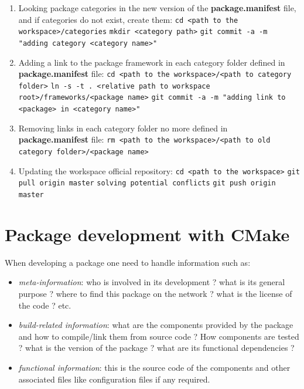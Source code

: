 \documentclass[12pt,a4paper]{article}
\begin{document}
\begin{enumerate}
\item Looking package categories in the new version of the \textbf{package.manifest} file, and if categories do not exist, create them:
\linebreak \verb|cd <path to the workspace>/categories|
\linebreak \verb|mkdir <category path>|
\linebreak \verb|git commit -a -m "adding category <category name>"|
\item Adding a link to the package framework in each category folder defined in \textbf{package.manifest} file:
\linebreak \verb|cd <path to the workspace>/<path to category folder>|
\linebreak \verb|ln -s -t . <relative path to workspace root>/frameworks/<package name>|
\linebreak \verb|git commit -a -m "adding link to <package> in <category name>"|
\item Removing links in each category folder no more defined in \textbf{package.manifest} file:
\linebreak \verb|rm <path to the workspace>/<path to old category folder>/<package name>|
\item Updating the workspace official repository:
\linebreak \verb|cd <path to the workspace>|
\linebreak \verb|git pull origin master|
\linebreak \verb|solving potential conflicts|
\linebreak \verb|git push origin master|
\end{enumerate}

\pagebreak

\section{Package development with CMake}

When developing a package one need to handle information such as:
\begin{itemize}
\item \textit{meta-information}: who is involved in its development ? what is its general purpose ? where to find this package on the network ? what is the license of the code ? etc.
\item \textit{build-related information}: what are the components provided by the package and how to compile/link them from source code ?  How components are tested ? what is the version of the package ? what are its functional dependencies ?
\item \textit{functional information}: this is the source code of the components and other associated files like configuration files if any required.
\end{itemize}
\end{document}
